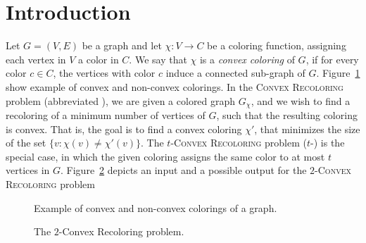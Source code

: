 
\section{Introduction}

Let $G = (V, E)$ be a graph and let $\chi : V \rightarrow C$ be a
coloring function, assigning each vertex in $V$ a color in $C$.  We
say that $\chi$ is a \emph{convex coloring} of $G$, if for every color
$c \in C$, the vertices with color $c$ induce a connected sub-graph of
$G$. Figure~\ref{fig:convex} show example of convex and non-convex colorings.
%
In the \textsc{Convex Recoloring} problem (abbreviated \CRP{}), 
we are given a colored graph $G_\chi$,
and we wish to find a recoloring of a minimum number of vertices of $G$,
such that the resulting coloring is convex. 
That is,
the goal is to find a convex coloring $\chi'$,
that minimizes the size of the set $\{v : \chi(v) \neq \chi'(v)\}$.
%
The \textsc{$t$-Convex Recoloring} problem ($t$-\CRP{}) is the special
case, in which the given coloring assigns the same color to at most
$t$ vertices in $G$.
Figure~\ref{fig:input-output} depicts an input and a possible output for the 
\textsc{$2$-Convex Recoloring} problem

\begin{figure}
\centering

\caption{
\label{fig:convex}
Example of convex and non-convex colorings of a graph.}
\end{figure}

\begin{figure}
\centering

\caption{
\label{fig:input-output}
The $2$-Convex Recoloring problem.
}
\end{figure}



